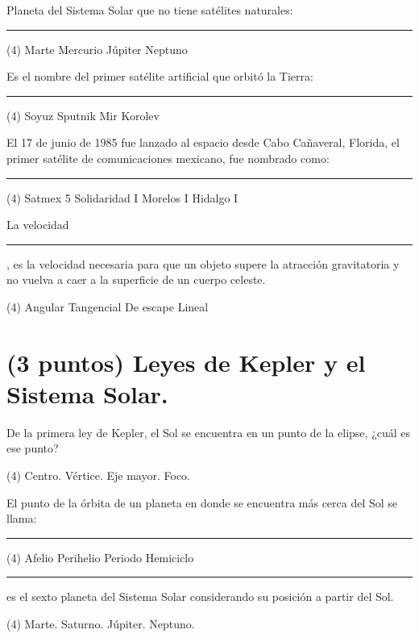 \documentclass[12pt, letter]{exam}
\begin{document}
\begin{questions}
    \question Planeta del Sistema Solar que no tiene satélites naturales: \rule{2cm}{0.1mm}
    \begin{tasks}(4)
        \task Marte
        \task Mercurio
        \task Júpiter
        \task Neptuno
    \end{tasks}
    \question Es el nombre del primer satélite artificial que orbitó la Tierra: \rule{2cm}{0.1mm}
    \begin{tasks}(4)
        \task Soyuz
        \task Sputnik
        \task Mir
        \task Korolev
    \end{tasks}
    \question El 17 de junio de 1985 fue lanzado al espacio desde Cabo Cañaveral, Florida, el primer satélite de comunicaciones mexicano, fue nombrado como: \rule{2cm}{0.1mm}
    \begin{tasks}(4)
        \task Satmex 5
        \task Solidaridad I
        \task Morelos I
        \task Hidalgo I
    \end{tasks}
    \question La velocidad \rule{2cm}{0.1mm}, es la velocidad necesaria para que un objeto supere la atracción gravitatoria y no vuelva a caer a la superficie de un cuerpo celeste.
    \begin{tasks}(4)
        \task Angular
        \task Tangencial
        \task De escape
        \task Lineal
    \end{tasks}


    \section{(3 puntos) Leyes de Kepler y el Sistema Solar.}

    \question De la primera ley de Kepler, el Sol se encuentra en un punto de la elipse, ¿cuál es ese punto?
    \begin{tasks}(4)
        \task Centro.
        \task Vértice.
        \task Eje mayor.
        \task Foco.
    \end{tasks}
    \question El punto de la órbita de un planeta en donde se encuentra más cerca del Sol se llama: \rule{2cm}{0.1mm}
    \begin{tasks}(4)
        \task Afelio
        \task Perihelio
        \task Periodo
        \task Hemiciclo
    \end{tasks}
    \question \rule{2cm}{0.1mm} es el sexto planeta del Sistema Solar considerando su posición a partir del Sol.
    \begin{tasks}(4)
        \task Marte.
        \task Saturno.
        \task Júpiter.
        \task Neptuno.
    \end{tasks}
   

\end{questions}
\end{document}
